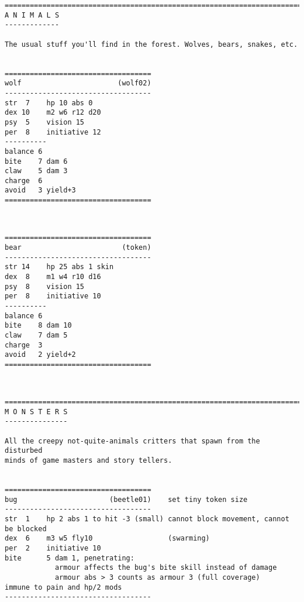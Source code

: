 \goodbreak
\raggedbottom
{}

\goodbreak \begin{samepage} \small \begin{verbatim}
================================================================================
A N I M A L S
-------------

The usual stuff you'll find in the forest. Wolves, bears, snakes, etc.


===================================
wolf                       (wolf02)
-----------------------------------
str  7    hp 10 abs 0
dex 10    m2 w6 r12 d20
psy  5    vision 15
per  8    initiative 12
----------
balance 6
bite    7 dam 6
claw    5 dam 3
charge  6
avoid   3 yield+3
===================================
\end{verbatim} \normalsize \end{samepage}

\

\goodbreak \begin{samepage} \small \begin{verbatim}
===================================
bear                        (token)
-----------------------------------
str 14    hp 25 abs 1 skin
dex  8    m1 w4 r10 d16
psy  8    vision 15
per  8    initiative 10
----------
balance 6
bite    8 dam 10
claw    7 dam 5
charge  3
avoid   2 yield+2
===================================
\end{verbatim} \normalsize \end{samepage}

\







\goodbreak
{}

\goodbreak \begin{samepage} \small \begin{verbatim}
================================================================================
M O N S T E R S
---------------

All the creepy not-quite-animals critters that spawn from the disturbed
minds of game masters and story tellers.


===================================
bug                      (beetle01)    set tiny token size
-----------------------------------
str  1    hp 2 abs 1 to hit -3 (small) cannot block movement, cannot be blocked
dex  6    m3 w5 fly10                  (swarming)
per  2    initiative 10
bite      5 dam 1, penetrating:
            armour affects the bug's bite skill instead of damage
            armour abs > 3 counts as armour 3 (full coverage)
immune to pain and hp/2 mods
-----------------------------------
\end{verbatim} \normalsize \end{samepage}

